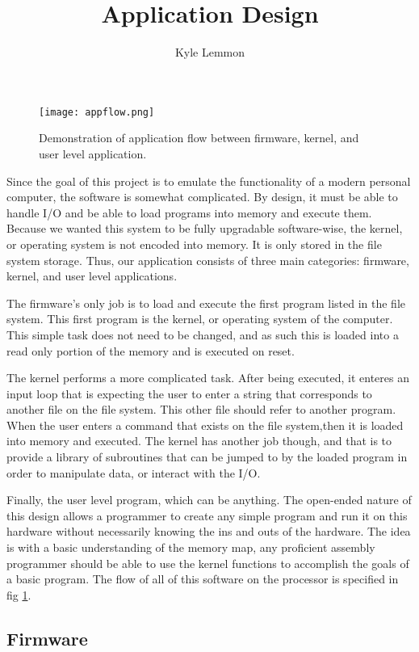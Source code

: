 \documentclass[../ProjectDocumentation.tex]{subfiles}
\title{\textbf{Application Design}}
\author{Kyle Lemmon}
\date{}
\begin{document}
\maketitle

\begin{figure}[h]
\centering
\texttt{[image: appflow.png]}
\caption{Demonstration of application flow between firmware, kernel, and user level application.}
\label{appflow}
\end{figure}

Since the goal of this project is to emulate the functionality of a modern personal computer, the software is somewhat complicated. By design, it must be able to handle I/O and be able to load programs into memory and execute them. Because we wanted this system to be fully upgradable software-wise, the kernel, or operating system is not encoded into memory. It is only stored in the file system storage. Thus, our application consists of three main categories: firmware, kernel, and user level applications.

The firmware's only job is to load and execute the first program listed in the file system. This first program is the kernel, or operating system of the computer. This simple task does not need to be changed, and as such this is loaded into a read only portion of the memory and is executed on reset.

The kernel performs a more complicated task. After being executed, it enteres an input loop that is expecting the user to enter a string that corresponds to another file on the file system. This other file should refer to another program. When the user enters a command that exists on the file system,then it is loaded into memory and executed. The kernel has another job though, and that is to provide a library of subroutines that can be jumped to by the loaded program in order to manipulate data, or interact with the I/O.

Finally, the user level program, which can be anything. The open-ended nature of this design allows a programmer to create any simple program and run it on this hardware without necessarily knowing the ins and outs of the hardware. The idea is with a basic understanding of the memory map, any proficient assembly programmer should be able to use the kernel functions to accomplish the goals of a basic program. The flow of all of this software on the processor is specified in fig \ref{appflow}.



\subsection{Firmware}
\end{document}
